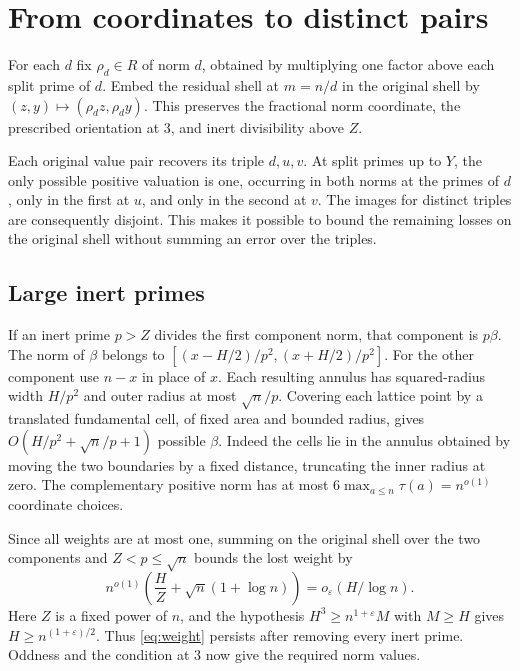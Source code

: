 \section{From coordinates to distinct pairs}\label{sec:count}
For each \(d\) fix \(\rho_d\in R\) of norm \(d\), obtained by
multiplying one factor above each split prime of \(d\).
Embed the residual shell at \(m=n/d\) in the original shell
by \((z,y)\mapsto(\rho_d z,\rho_d y)\). This preserves the
fractional norm coordinate, the prescribed orientation at \(3\),
and inert divisibility above \(Z\).

Each original value pair recovers its triple \(d,u,v\).
At split primes up to \(Y\), the only possible positive valuation
is one, occurring in both norms at the primes of \(d\), only
in the first at \(u\), and only in the second at \(v\).
The images for distinct triples are consequently disjoint.
This makes it possible to bound the remaining losses on the
original shell without summing an error over the triples.

\subsection{Large inert primes}
If an inert prime \(p>Z\) divides the first component norm,
that component is \(p\beta\). The norm of \(\beta\) belongs to
\([(x-H/2)/p^2,(x+H/2)/p^2]\). For the other component use
\(n-x\) in place of \(x\). Each resulting annulus has
squared-radius width \(H/p^2\) and outer radius at most
\(\sqrt n/p\). Covering each lattice point by a translated
fundamental cell, of fixed area and bounded radius, gives
\(O(H/p^2+\sqrt n/p+1)\) possible \(\beta\). Indeed the cells
lie in the annulus obtained by moving the two boundaries by
a fixed distance, truncating the inner radius at zero.
The complementary positive norm has at most
\(6\max_{a\le n}\tau(a)=n^{o(1)}\) coordinate choices.

Since all weights are at most one, summing on the original
shell over the two components and \(Z<p\le\sqrt n\) bounds
the lost weight by
\[
 n^{o(1)}\left(\frac H Z+\sqrt n(1+\log n)\right)
             =o_\varepsilon(H/\log n).
\]
Here \(Z\) is a fixed power of \(n\), and the hypothesis
\(H^3\ge n^{1+\varepsilon}M\) with \(M\ge H\) gives
\(H\ge n^{(1+\varepsilon)/2}\). Thus \eqref{eq:weight}
persists after removing every inert prime. Oddness and the
condition at \(3\) now give the required norm values.

